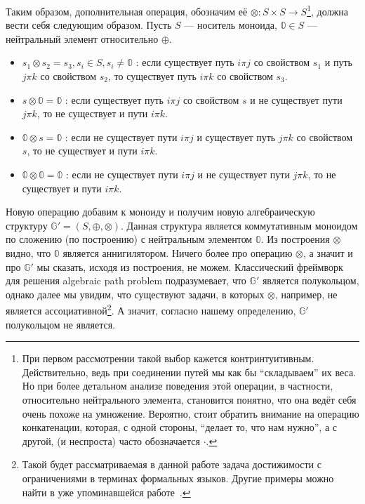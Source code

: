 Таким образом, дополнительная операция, обозначим её $\otimes: S \times S \to S$\footnote{При первом рассмотрении такой выбор кажется контринтуитивным. Действительно, ведь при соединении путей мы как бы ``складываем'' их веса. Но при более детальном анализе поведения этой операции, в частности, относительно нейтрального элемента, становится понятно, что она ведёт себя очень похоже на умножение. Вероятно, стоит обратить внимание на операцию конкатенации, которая, с одной стороны, ``делает то, что нам нужно'', а с другой, (и неспроста) часто обозначается $\cdot$.}, должна вести себя следующим образом. Пусть $S$ --- носитель моноида, $\mathbb{0} \in S$ --- нейтральный элемент относительно $\oplus$.
\begin{itemize}\label{itm:otimesIntro}
  \item $s_1 \otimes s_2 = s_3, s_i \in S, s_i \neq \mathbb{0}$ : если существует путь $i \pi j$ со свойством $s_1$ и путь $j \pi k$ со свойством $s_2$, то существует путь $i \pi k$ со свойством $s_3$.
  \item $s \otimes \mathbb{0} = \mathbb{0}$ : если существует путь $i \pi j$ со свойством $s$ и не существует пути $j \pi k$, то не существует и пути $i \pi k$.
  \item $\mathbb{0} \otimes s = \mathbb{0}$ : если не существует пути $i \pi j$ и существует путь $j \pi k$ со свойством $s$, то не существует и пути $i \pi k$.
  \item $\mathbb{0} \otimes \mathbb{0} = \mathbb{0}$ : если не существует пути $i \pi j$ и не существует пути $j \pi k$, то не существует и пути $i \pi k$.
\end{itemize}

Новую операцию добавим к моноиду и получим новую алгебраическую структуру $\mathbb{G}' = (S, \oplus,\otimes)$. Данная структура является коммутативным моноидом по сложению (по построению) с нейтральным элементом $\mathbb{0}$. Из построения $\otimes$ видно, что $\mathbb{0}$ является аннигилятором. Ничего более про операцию $\otimes$, а значит и про $\mathbb{G}'$ мы сказать, исходя из построения, не можем. Классический фреймворк для решения algebraic path problem подразумевает, что $\mathbb{G}'$ является полукольцом, однако далее мы увидим, что существуют задачи, в которых $\otimes$, например, не является ассоциативной\footnote{Такой будет рассматриваемая в данной работе задача достижимости с ограничениями в терминах формальных языков. Другие примеры можно найти в уже упоминавшейся работе~\cite{Baras2010PathPI}.}. А значит, согласно нашему определению, $\mathbb{G}'$ полукольцом не является.

